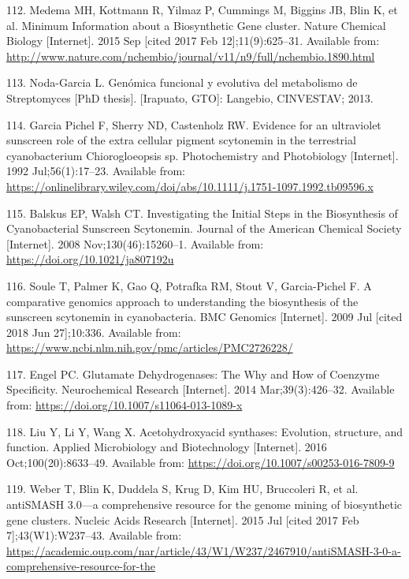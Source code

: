 \documentclass[12pt,twoside]{reedthesis}
\begin{document}
  \hypertarget{ref-medema_minimum_2015}{}
  112. Medema MH, Kottmann R, Yilmaz P, Cummings M, Biggins JB, Blin K, et
  al. Minimum Information about a Biosynthetic Gene cluster. Nature
  Chemical Biology {[}Internet{]}. 2015 Sep {[}cited 2017 Feb
  12{]};11(9):625--31. Available from:
  \url{http://www.nature.com/nchembio/journal/v11/n9/full/nchembio.1890.html}
  
  \hypertarget{ref-cruz_tesis_2013}{}
  113. Noda-Garcia L. Genómica funcional y evolutiva del metabolismo de
  Streptomyces {[}PhD thesis{]}. {[}Irapuato, GTO{]}: Langebio, CINVESTAV;
  2013.
  
  \hypertarget{ref-garciapichel_evidence_1992}{}
  114. Garcia Pichel F, Sherry ND, Castenholz RW. Evidence for an
  ultraviolet sunscreen role of the extra cellular pigment scytonemin in
  the terrestrial cyanobacterium Chiorogloeopsis sp. Photochemistry and
  Photobiology {[}Internet{]}. 1992 Jul;56(1):17--23. Available from:
  \url{https://onlinelibrary.wiley.com/doi/abs/10.1111/j.1751-1097.1992.tb09596.x}
  
  \hypertarget{ref-balskus_investigating_2008}{}
  115. Balskus EP, Walsh CT. Investigating the Initial Steps in the
  Biosynthesis of Cyanobacterial Sunscreen Scytonemin. Journal of the
  American Chemical Society {[}Internet{]}. 2008 Nov;130(46):15260--1.
  Available from: \url{https://doi.org/10.1021/ja807192u}
  
  \hypertarget{ref-soule_comparative_2009}{}
  116. Soule T, Palmer K, Gao Q, Potrafka RM, Stout V, Garcia-Pichel F. A
  comparative genomics approach to understanding the biosynthesis of the
  sunscreen scytonemin in cyanobacteria. BMC Genomics {[}Internet{]}. 2009
  Jul {[}cited 2018 Jun 27{]};10:336. Available from:
  \url{https://www.ncbi.nlm.nih.gov/pmc/articles/PMC2726228/}
  
  \hypertarget{ref-engel_glutamate_2014}{}
  117. Engel PC. Glutamate Dehydrogenases: The Why and How of Coenzyme
  Specificity. Neurochemical Research {[}Internet{]}. 2014
  Mar;39(3):426--32. Available from:
  \url{https://doi.org/10.1007/s11064-013-1089-x}
  
  \hypertarget{ref-liu_acetohydroxyacid_2016}{}
  118. Liu Y, Li Y, Wang X. Acetohydroxyacid synthases: Evolution,
  structure, and function. Applied Microbiology and Biotechnology
  {[}Internet{]}. 2016 Oct;100(20):8633--49. Available from:
  \url{https://doi.org/10.1007/s00253-016-7809-9}
  
  \hypertarget{ref-weber_antismash3_2015}{}
  119. Weber T, Blin K, Duddela S, Krug D, Kim HU, Bruccoleri R, et al.
  antiSMASH 3.0---a comprehensive resource for the genome mining of
  biosynthetic gene clusters. Nucleic Acids Research {[}Internet{]}. 2015
  Jul {[}cited 2017 Feb 7{]};43(W1):W237--43. Available from:
  \url{https://academic.oup.com/nar/article/43/W1/W237/2467910/antiSMASH-3-0-a-comprehensive-resource-for-the}
  
\end{document}
